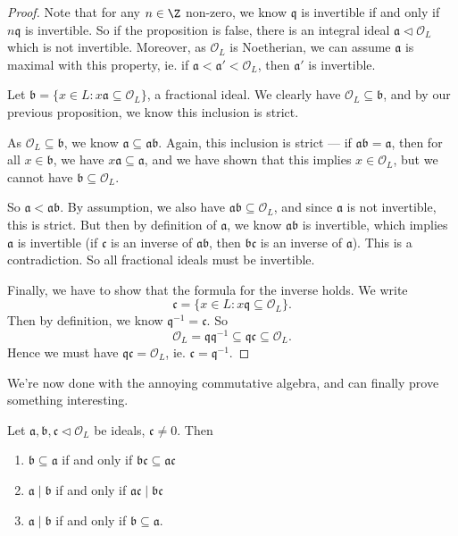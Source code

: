 \documentclass[a4paper]{article}
\begin{document}
\begin{proof}
  Note that for any $n \in \Z$ non-zero, we know $\mathfrak{q}$ is invertible if and only if $n\mathfrak{q}$ is invertible. So if the proposition is false, there is an integral ideal $\mathfrak{a} \lhd \mathcal{O}_L$ which is not invertible. Moreover, as $\mathcal{O}_L$ is Noetherian, we can assume $\mathfrak{a}$ is maximal with this property, ie. if $\mathfrak{a} < \mathfrak{a}' < \mathcal{O}_L$, then $\mathfrak{a}'$ is invertible.

  Let $\mathfrak{b} = \{x \in L: x \mathfrak{a} \subseteq \mathcal{O}_L\}$, a fractional ideal. We clearly have $\mathcal{O}_L \subseteq \mathfrak{b}$, and by our previous proposition, we know this inclusion is strict.

  As $\mathcal{O}_L \subseteq \mathfrak{b}$, we know $\mathfrak{a} \subseteq \mathfrak{a} \mathfrak{b}$. Again, this inclusion is strict --- if $\mathfrak{a} \mathfrak{b} = \mathfrak{a}$, then for all $x \in \mathfrak{b}$, we have $x\mathfrak{a} \subseteq \mathfrak{a}$, and we have shown that this implies $x \in \mathcal{O}_L$, but we cannot have $\mathfrak{b} \subseteq \mathcal{O}_L$.

  So $\mathfrak{a} < \mathfrak{a} \mathfrak{b}$. By assumption, we also have $\mathfrak{a} \mathfrak{b} \subseteq \mathcal{O}_L$, and since $\mathfrak{a}$ is not invertible, this is strict. But then by definition of $\mathfrak{a}$, we know $\mathfrak{a}\mathfrak{b}$ is invertible, which implies $\mathfrak{a}$ is invertible (if $\mathfrak{c}$ is an inverse of $\mathfrak{a}\mathfrak{b}$, then $\mathfrak{b}\mathfrak{c}$ is an inverse of $\mathfrak{a}$). This is a contradiction. So all fractional ideals must be invertible.

  Finally, we have to show that the formula for the inverse holds. We write
  \[
    \mathfrak{c} = \{x \in L: x\mathfrak{q} \subseteq \mathcal{O}_L \}.
  \]
  Then by definition, we know $\mathfrak{q}^{-1} = \mathfrak{c}$. So
  \[
    \mathcal{O}_L = \mathfrak{q}\mathfrak{q}^{-1}\subseteq \mathfrak{q} \mathfrak{c} \subseteq \mathcal{O}_L.
  \]
  Hence we must have $\mathfrak{q}\mathfrak{c} = \mathcal{O}_L$, ie. $\mathfrak{c} = \mathfrak{q}^{-1}$.
\end{proof}

We're now done with the annoying commutative algebra, and can finally prove something interesting.
\begin{cor}
  Let $\mathfrak{a}, \mathfrak{b}, \mathfrak{c}\lhd \mathcal{O}_L$ be ideals, $\mathfrak{c} \not= 0$. Then
  \begin{enumerate}
    \item $\mathfrak{b} \subseteq \mathfrak{a}$ if and only if $\mathfrak{b}\mathfrak{c} \subseteq \mathfrak{a}\mathfrak{c}$
    \item $\mathfrak{a} \mid \mathfrak{b}$ if and only if $\mathfrak{a} \mathfrak{c} \mid \mathfrak{b}\mathfrak{c}$
    \item $\mathfrak{a} \mid \mathfrak{b}$ if and only if $\mathfrak{b} \subseteq \mathfrak{a}$.
  \end{enumerate}
\end{cor}
\end{document}
